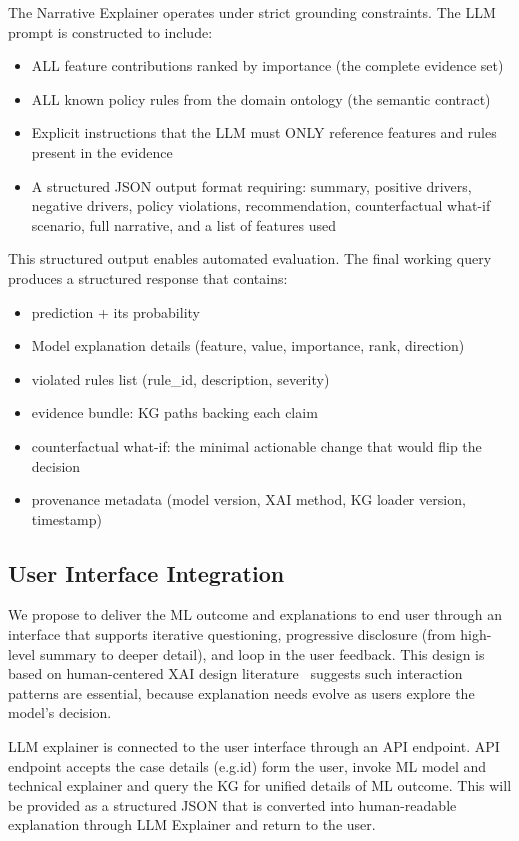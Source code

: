 \documentclass[lnbip]{svmultln}
\begin{document}
The Narrative Explainer operates under strict grounding constraints. The LLM prompt is constructed to include:
\begin{itemize}
    \item ALL feature contributions ranked by importance (the complete evidence set)
    \item ALL known policy rules from the domain ontology (the semantic contract)
    \item Explicit instructions that the LLM must ONLY reference features and rules present in the evidence
    \item A structured JSON output format requiring: summary, positive drivers, negative drivers, policy violations, recommendation, counterfactual what-if scenario, full narrative, and a list of features used
\end{itemize}

This structured output enables automated evaluation. The final working query produces a structured response that contains:
\begin{itemize}
    \item prediction + its probability
    \item Model explanation details (feature, value, importance, rank, direction)
    \item violated rules list (rule\_id, description, severity)
    \item evidence bundle: KG paths backing each claim
    \item counterfactual what-if: the minimal actionable change that would flip the decision
    \item provenance metadata (model version, XAI method, KG loader version, timestamp)
\end{itemize}

    
\subsection{User Interface Integration}
We propose to deliver the ML outcome and explanations to end user through an interface that supports iterative questioning, progressive disclosure (from high-level summary to deeper detail), and loop in the user feedback. This design is based on human-centered XAI design literature~\cite{miller2019} suggests such interaction patterns are essential, because explanation needs evolve as users explore the model's decision.

LLM explainer is connected to the user interface through an API endpoint.
API endpoint accepts the case details (e.g.id) form the user, invoke ML model and technical explainer and query the KG for unified details of ML outcome. This will be provided as a structured JSON that is converted into human-readable explanation through LLM Explainer and return to the user.
\end{document}
